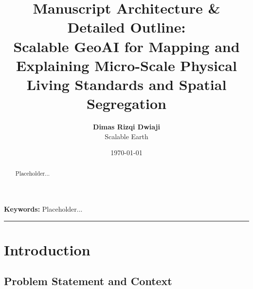 \documentclass[11pt,a4paper]{article}
\title{\textbf{Manuscript Architecture \& Detailed Outline: \\ Scalable GeoAI for Mapping and Explaining Micro-Scale Physical Living Standards and Spatial Segregation}}
\author{
    \textbf{Dimas Rizqi Dwiaji} \\
    Scalable Earth \\
}
\date{\today}
\begin{document}
\maketitle

\begin{abstract}
Placeholder...
\end{abstract}

\noindent\textbf{Keywords:} Placeholder...

\vspace{1em}
\hrule
\vspace{1.5em}

\section{Introduction}
\subsection{Problem Statement and Context}
\end{document}
